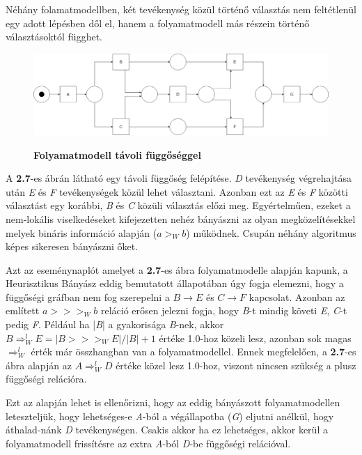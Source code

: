 Néhány folamatmodellben, két tevékenység közül történő választás nem feltétlenül egy adott lépésben dől el, hanem a folyamatmodell más részein történő választásoktól függhet.

\begin{figure}[h!]
\begin{center}
\caption{\textbf{Folyamatmodell távoli függőséggel}}
\includegraphics[width=\textwidth,keepaspectratio=true]{images/img_heuristic_longdistance}
\label{fig:plan}
\end{center}
\end{figure}

A \textbf{2.7}-es ábrán látható egy távoli függőség felépítése. \textit{D} tevékenység végrehajtása után \textit{E} és \textit{F} tevékenységek közül lehet választani. Azonban ezt az \textit{E} és \textit{F} közötti választást egy korábbi, \textit{B} és \textit{C} közüli választás előzi meg. Egyértelműen, ezeket a nem-lokális viselkedéseket kifejezetten nehéz bányászni az olyan megközelítésekkel melyek bináris információ alapján ($a>_Wb$) működnek. Csupán néhány algoritmus képes sikeresen bányászni őket.

Azt az eseménynaplót amelyet a \textbf{2.7}-es ábra folyamatmodelle alapján kapunk, a Heurisztikus Bányász eddig bemutatott állapotában úgy fogja elemezni, hogy a függőségi gráfban nem fog szerepelni a $B\rightarrow E$ és $C\rightarrow F$ kapcsolat. Azonban az említett $a>>>_Wb$ reláció erősen jelezni fogja, hogy \textit{B}-t mindig követi \textit{E}, \textit{C}-t pedig \textit{F}. Például ha |\textit{B}| a gyakorisága \textit{B}-nek, akkor $B\Rightarrow_W^l E = |B >>>_WE|/|B|+1$ értéke 1.0-hoz közeli lesz, azonban sok magas $\Rightarrow_W^l $ érték már összhangban van a folyamatmodellel. Ennek megfelelően, a \textbf{2.7}-es ábra alapján az $A\Rightarrow_W^lD$ értéke közel lesz 1.0-hoz, viszont nincsen szükség a plusz függőségi relációra.

Ezt az alapján lehet is ellenőrizni, hogy az eddig bányászott folyamatmodellen leteszteljük, hogy lehetséges-e \textit{A}-ból a végállapotba (\textit{G}) eljutni anélkül, hogy áthalad\hyp{}nánk \textit{D} tevékenységen. Csakis akkor ha ez lehetséges, akkor kerül a folyamatmodell frissítésre az extra \textit{A}-ból \textit{D}-be függőségi relációval.

